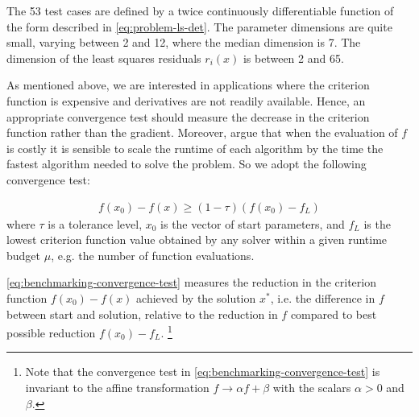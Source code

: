 \noindent The 53 test cases are defined by a twice continuously differentiable function of the form described in \ref{eq:problem-ls-det}. The parameter dimensions are quite small, varying between 2 and 12,
where the median dimension is 7. The dimension of the least squares residuals $r_i(x)$ is between 2 and 65.



\noindent As mentioned above, we are interested in applications where the criterion function is expensive and derivatives are not readily available. Hence, an appropriate convergence test should measure the decrease in the criterion function rather than the gradient.
Moreover, \cite{MoreWild2009} argue that when the evaluation of $f$ is costly it is sensible to scale the runtime of each algorithm by the time the fastest algorithm needed to solve the problem. So we adopt the following convergence test:


\begin{align}
        f(x_0) - f(x) \geq (1 - \tau)(f(x_0) - f_L)
        \label{eq:benchmarking-convergence-test}
\end{align}
where $\tau$ is a tolerance level, $x_0$ is the vector of start parameters, and $f_L$ is the lowest criterion function value obtained by any solver within a given runtime budget $\mu$, e.g. the number of function evaluations.

\noindent \ref{eq:benchmarking-convergence-test} measures the reduction in the criterion function $f(x_0) - f(x)$ achieved by the solution $x^*$, i.e. the difference in $f$ between start and solution, relative to the reduction in $f$ compared to best possible reduction $f(x_0) - f_L$.
\footnote{Note that the convergence test in \ref{eq:benchmarking-convergence-test} is invariant to the affine transformation $f \rightarrow \alpha f + \beta$ with the scalars $\alpha > 0$ and $\beta$.}


